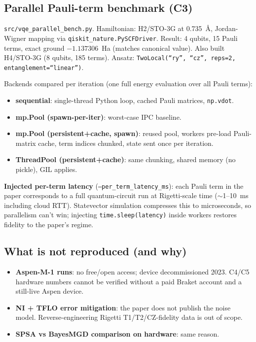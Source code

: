 \documentclass[11pt]{article}
\begin{document}
\subsection{Parallel Pauli-term benchmark (C3)}
\texttt{src/vqe\_parallel\_bench.py}. Hamiltonian: H2/STO-3G at 0.735~\AA, Jordan-Wigner mapping via \texttt{qiskit\_nature.PySCFDriver}. Result: 4 qubits, 15 Pauli terms, exact ground $-1.137306$~Ha (matches canonical value). Also built H4/STO-3G (8 qubits, 185 terms). Ansatz: \texttt{TwoLocal(``ry'', ``cz'', reps=2, entanglement=``linear'')}.

Backends compared per iteration (one full energy evaluation over all Pauli terms):
\begin{itemize}
  \item \textbf{sequential}: single-thread Python loop, cached Pauli matrices, \texttt{np.vdot}.
  \item \textbf{mp.Pool (spawn-per-iter)}: worst-case IPC baseline.
  \item \textbf{mp.Pool (persistent+cache, spawn)}: reused pool, workers pre-load Pauli-matrix cache, term indices chunked, state sent once per iteration.
  \item \textbf{ThreadPool (persistent+cache)}: same chunking, shared memory (no pickle), GIL applies.
\end{itemize}

\textbf{Injected per-term latency} (\texttt{--per\_term\_latency\_ms}): each Pauli term in the paper corresponds to a full quantum-circuit run at Rigetti-scale time ($\sim$1--10~ms including cloud RTT). Statevector simulation compresses this to microseconds, so parallelism can't win; injecting \texttt{time.sleep(latency)} inside workers restores fidelity to the paper's regime.

\subsection{What is not reproduced (and why)}
\begin{itemize}
  \item \textbf{Aspen-M-1 runs}: no free/open access; device decommissioned 2023. C4/C5 hardware numbers cannot be verified without a paid Braket account and a still-live Aspen device.
  \item \textbf{NI + TFLO error mitigation}: the paper does not publish the noise model. Reverse-engineering Rigetti T1/T2/CZ-fidelity data is out of scope.
  \item \textbf{SPSA vs BayesMGD comparison on hardware}: same reason.
\end{itemize}
\end{document}
